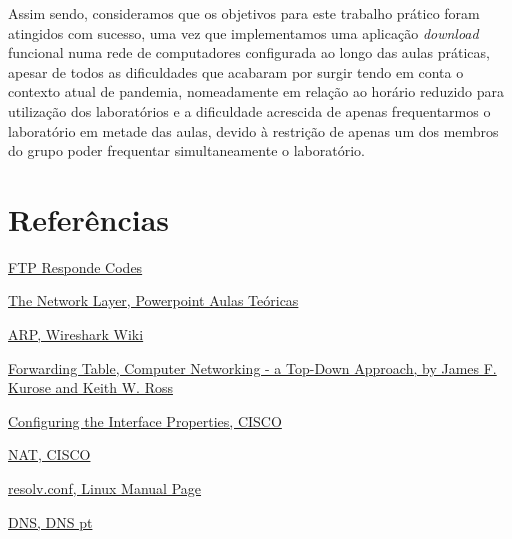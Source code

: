 \documentclass[article, a4paper, 11pt, oneside]{memoir}
\begin{document}
Assim sendo, consideramos que os objetivos para este trabalho prático foram atingidos com
sucesso, uma vez que implementamos uma aplicação \textit{download} funcional numa
rede de computadores configurada ao longo das aulas práticas, apesar de todos as dificuldades
que acabaram por surgir tendo em conta o contexto atual de pandemia, nomeadamente em relação
ao horário reduzido para utilização dos laboratórios e a dificuldade acrescida de
apenas frequentarmos o laboratório em metade das aulas, devido à restrição de apenas um dos
membros do grupo poder frequentar simultaneamente o laboratório.

\chapter[Referências][Referências]{Referências} \label{\thechapter}

\hyperlink{https://en.wikipedia.org/wiki/List_of_FTP_server_return_codes}{FTP Responde Codes}

\hyperlink{https://moodle.up.pt/pluginfile.php/36774/mod_resource/content/6/network.pdf}{The 
Network Layer, Powerpoint Aulas Teóricas}

\hyperlink{https://wiki.wireshark.org/AddressResolutionProtocol}{ARP, Wireshark Wiki}

\hyperlink{James F. Kurose, Keith W. Ross, Computer Networking - a Top-Down Approach, 6th Edition, Pearson}{Forwarding Table, Computer Networking - a Top-Down Approach, by James F. Kurose and Keith W. Ross}

\hyperlink{https://www.cisco.com/c/en/us/td/docs/wireless/mwr_2941_dc/software_config/guide/3_4/2941_34_Config_Guide/ge_ifcs.html}{Configuring the Interface Properties, CISCO}

\hyperlink{https://www.cisco.com/c/en/us/support/docs/ip/network-address-translation-nat/26704-nat-faq-00.html}{NAT, CISCO}

\hyperlink{https://man7.org/linux/man-pages/man5/resolv.conf.5.html}{resolv.conf, Linux Manual Page}

\hyperlink{https://www.dns.pt/pt/dominio/o-sistema-dns/}{DNS, DNS pt}

\newpage

\end{document}
